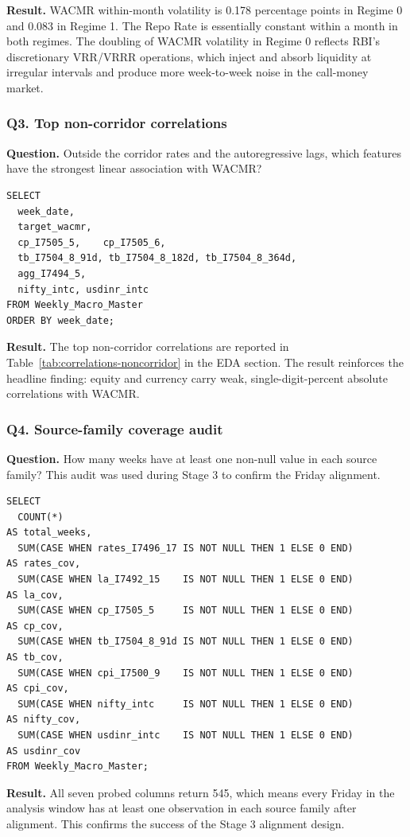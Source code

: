 \textbf{Result.} WACMR within-month volatility is 0.178 percentage
points in Regime 0 and 0.083 in Regime 1. The Repo Rate is essentially
constant within a month in both regimes. The doubling of WACMR
volatility in Regime 0 reflects RBI's discretionary VRR/VRRR
operations, which inject and absorb liquidity at irregular intervals
and produce more week-to-week noise in the call-money market.

\subsubsection*{Q3. Top non-corridor correlations}

\textbf{Question.} Outside the corridor rates and the autoregressive
lags, which features have the strongest linear association with
WACMR?

\begin{lstlisting}[style=sql,caption={Q3, exporting the top non-corridor correlated columns to Python for inspection.}]
SELECT
  week_date,
  target_wacmr,
  cp_I7505_5,    cp_I7505_6,
  tb_I7504_8_91d, tb_I7504_8_182d, tb_I7504_8_364d,
  agg_I7494_5,
  nifty_intc, usdinr_intc
FROM Weekly_Macro_Master
ORDER BY week_date;
\end{lstlisting}

\textbf{Result.} The top non-corridor correlations are reported in
Table~\ref{tab:correlations-noncorridor} in the EDA section. The
result reinforces the headline finding: equity and currency carry
weak, single-digit-percent absolute correlations with WACMR.

\subsubsection*{Q4. Source-family coverage audit}

\textbf{Question.} How many weeks have at least one non-null value in
each source family? This audit was used during Stage 3 to confirm the
Friday alignment.

\begin{lstlisting}[style=sql,caption={Q4, per-family coverage audit.}]
SELECT
  COUNT(*)                                                           AS total_weeks,
  SUM(CASE WHEN rates_I7496_17 IS NOT NULL THEN 1 ELSE 0 END)        AS rates_cov,
  SUM(CASE WHEN la_I7492_15    IS NOT NULL THEN 1 ELSE 0 END)        AS la_cov,
  SUM(CASE WHEN cp_I7505_5     IS NOT NULL THEN 1 ELSE 0 END)        AS cp_cov,
  SUM(CASE WHEN tb_I7504_8_91d IS NOT NULL THEN 1 ELSE 0 END)        AS tb_cov,
  SUM(CASE WHEN cpi_I7500_9    IS NOT NULL THEN 1 ELSE 0 END)        AS cpi_cov,
  SUM(CASE WHEN nifty_intc     IS NOT NULL THEN 1 ELSE 0 END)        AS nifty_cov,
  SUM(CASE WHEN usdinr_intc    IS NOT NULL THEN 1 ELSE 0 END)        AS usdinr_cov
FROM Weekly_Macro_Master;
\end{lstlisting}

\textbf{Result.} All seven probed columns return 545, which means
every Friday in the analysis window has at least one observation in
each source family after alignment. This confirms the success of the
Stage 3 alignment design.
